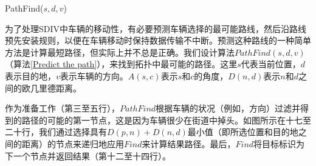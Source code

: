 \begin{algorithm}[t]
\caption{PathFind($s,d,v$)}
\label{Algorithm 2}
\begin{algorithmic}[1]

\end{algorithmic}
\vspace{-0.06in}
\end{algorithm}

为了处理SDIV中车辆的移动性，有必要预测车辆选择的最可能路线，然后沿路线预先安装规则，以便在车辆移动时保持数据传输不中断。预测这种路线的一种简单方法是计算最短路径，但实际上并不总是正确。我们设计算法$PathFind(s,d,v)$（算法\ref{Predict the path}），来找到拓扑中最可能的路径。这里$s$代表当前位置，$d$表示目的地，$v$表示车辆的方向。$ A(s,c)$表示$s$和$c$的角度，$D(n,d)$表示$n$和$d$之间的欧几里德距离。



作为准备工作（第三至五行），$PathFind$根据车辆的状况（例如，方向）过滤并得到的路径的可能的第一节点，这是因为车辆很少在街道中掉头。如图所示在十七至二十行，我们通过选择具有$D(p,n)+D(n,d)$最小值（即所选位置和目的地之间的距离）的节点来递归地应用$Find$来计算结果路径。最后，$Find$将目标标识为下一个节点并返回结果（第十二至十四行）。

